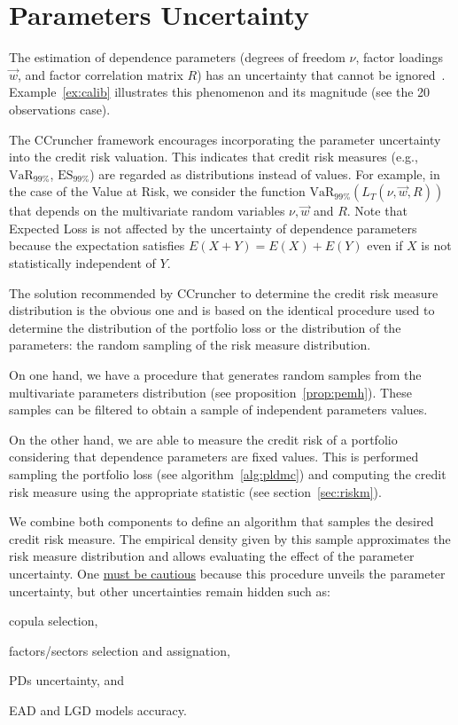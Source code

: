 \documentclass[11pt,fleqn]{book} %
\begin{document}
\section{Parameters Uncertainty}

The estimation of dependence parameters (degrees of freedom $\nu$, factor
loadings $\vec{w}$, and factor correlation matrix $R$) has an uncertainty 
that cannot be ignored~\cite{tarashev:2010,gossl:2005}. Example~\ref{ex:calib} 
illustrates this phenomenon and its magnitude (see the 20 observations case).

The CCruncher framework encourages incorporating the parameter uncertainty 
into the credit risk valuation. This indicates that credit risk measures
(e.g., $\text{VaR}_{99\%}$, $\text{ES}_{99\%}$) are regarded as distributions 
instead of values. For example, in the case of the Value at Risk, we consider
the function $\text{VaR}_{99\%}(L_T(\nu,\vec{w},R))$ that depends on 
the multivariate random variables $\nu, \vec{w}$ and $R$.
Note that Expected Loss is not affected by the uncertainty of dependence 
parameters because the expectation satisfies $E(X+Y)=E(X)+E(Y)$ even if 
$X$ is not statistically independent of $Y$.

The solution recommended by CCruncher to determine the credit risk measure 
distribution is the obvious one and is based on the identical procedure 
used to determine the distribution of the portfolio loss or the distribution 
of the parameters: the random sampling of the risk measure distribution. 

On one hand, we have a procedure that generates random samples from the 
multivariate parameters distribution (see proposition~\ref{prop:pemh}).
These samples can be filtered to obtain a sample of independent parameters 
values.

On the other hand, we are able to measure the credit risk of a portfolio 
considering that dependence parameters are fixed values. This is performed 
sampling the portfolio loss (see algorithm~\ref{alg:pldmc}) and computing 
the credit risk measure using the appropriate statistic (see 
section~\ref{sec:riskm}).

We combine both components to define an algorithm that samples the desired
credit risk measure. The empirical density given by this sample 
approximates the risk measure distribution and allows evaluating the 
effect of the parameter uncertainty. One \ul{must be cautious} because this 
procedure unveils the parameter uncertainty, but other uncertainties remain 
hidden such as:
\begin{inparaenum}[1)]
	\item copula selection, 
	\item factors/sectors selection and assignation,
	\item PDs uncertainty, and
	\item EAD and LGD models accuracy.
\end{inparaenum}
\end{document}

